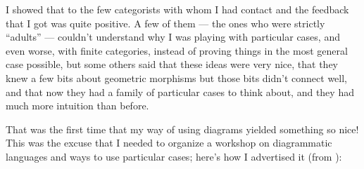 \documentclass[oneside,12pt]{article}
\begin{document}
I showed that to the few categorists with whom I had contact and the
feedback that I got was quite positive. A few of them --- the ones who
were strictly ``adults'' --- couldn't understand why I was playing
with particular cases, and even worse, with finite categories, instead
of proving things in the most general case possible, but some others
said that these ideas were very nice, that they knew a few bits about
geometric morphisms but those bits didn't connect well, and that now
they had a family of particular cases to think about, and they had
much more intuition than before.

That was the first time that my way of using diagrams yielded
something so nice! This was the excuse that I needed to organize a
workshop on diagrammatic languages and ways to use particular
cases; here's how I advertised it (from \cite{OchsLucatelli}):
%
\end{document}
